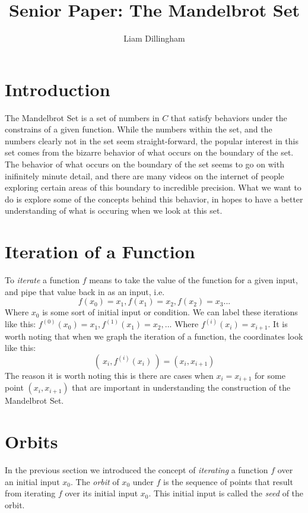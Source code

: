 \documentclass[20pt]{article} %
\title{Senior Paper: The Mandelbrot Set}
\author{Liam Dillingham}
\begin{document}
\maketitle

\section{Introduction}
The Mandelbrot Set is a set of numbers in $\!C$ that satisfy behaviors under the constrains of a given function.  While the numbers within the set, and the numbers clearly not in the set seem straight-forward, the popular interest in this set comes from the bizarre behavior of what occurs on the boundary of the set.  The behavior of what occurs on the boundary of the set seems to go on with inifinitely minute detail, and there are many videos on the internet of people exploring certain areas of this boundary to incredible precision.  What we want to do is explore some of the concepts behind this behavior, in hopes to have a better understanding of what is occuring when we look at this set.

\section{Iteration of a Function}
To \textit{iterate} a function $f$ means to take the value of the function for a given input, and pipe that value back in as an input, i.e. 
$$ f(x_0)=x_1, f(x_1)=x_2, f(x_2)=x_3 ...$$
Where $x_0$ is some sort of initial input or condition.  We can label these iterations like this: $f^{(0)}(x_0)=x_1, f^{(1)}(x_1)=x_2, ...$ Where $f^{(i)}(x_i)=x_{i+1}$.  It is worth noting that when we graph the iteration of a function, the coordinates look like this: 
$$( \ x_i, f^{(i)}(x_i)\ ) = (x_i, x_{i+1}) $$ 
The reason it is worth noting this is there are cases when $x_i = x_{i+1}$ for some point $(x_i, x_{i+1})$ that are important in understanding the construction of the Mandelbrot Set.

\section{Orbits}
In the previous section we introduced the concept of \textit{iterating} a function $f$ over an initial input $x_0$.  The \textit{orbit} of $x_0$ under $f$ is the sequence of points that result from iterating $f$ over its initial input $x_0$.  This initial input is called the \textit{seed} of the orbit. \\
\end{document}
